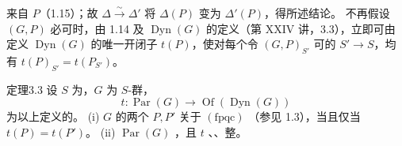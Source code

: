来自 $P$（1.15）；故 $\Delta\xrightarrow{\sim}\Delta'$ 将 $\Delta(P)$ 变为 $\Delta'(P)$，得所述结论。
不再假设 $(G,P)$ 必可时，由 1.14 及 $\operatorname{Dyn}(G)$ 的定义（第 XXIV 讲，3.3），立即可由定义 $\operatorname{Dyn}(G)$ 的唯一开闭子 $t(P)$，使对每个令 $(G,P)_{S'}$ 可的 $S'\to S$，均有 $t(P)_{S'}=t(P_{S'})$。
\begin{SGAresult}{定理}{3.3}
设 $S$ 为，$G$ 为 $S$-群，
\[t:\operatorname{Par}(G)\longrightarrow\operatorname{Of}(\operatorname{Dyn}(G))\]
为以上定义的。
(i) $G$ 的两个 $P,P'$ 关于 $(\mathrm{fpqc})$ （参见 1.3），当且仅当 $t(P)=t(P')$。
(ii) $\operatorname{Par}(G)$ ，且 $t$ 、、整。
\end{SGAresult}
